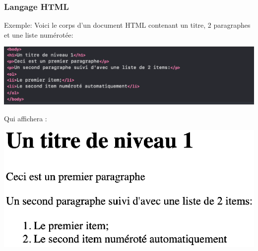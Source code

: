 \documentclass[8pt]{beamer}
\newcounter{num}
\begin{document}
\begin{frame}
\frametitle{Langage HTML}

\begin{exampleblock}{Exemple:}
Voici le corps d'un document HTML contenant un titre, 2 paragraphes et une liste numérotée:
\begin{center}
\includegraphics[scale=0.38]{img/exemple3-code.eps}
\end{center}
Qui affichera :
\begin{center}
\includegraphics[scale=0.38]{img/exemple3.eps}
\end{center}
\end{exampleblock}
\end{frame}
\end{document}
